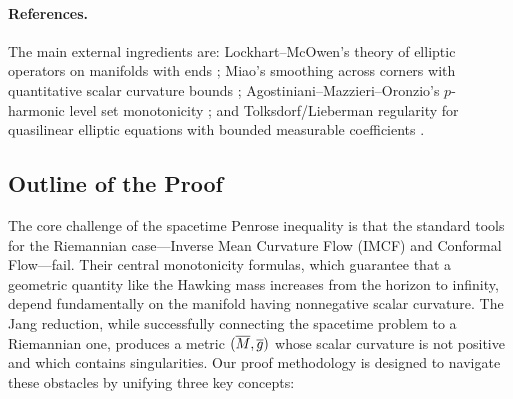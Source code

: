 \paragraph{References.}
The main external ingredients are: Lockhart--McOwen's theory of elliptic operators on manifolds with ends \cite{lockhartmccowen1985}; Miao's smoothing across corners with quantitative scalar curvature bounds \cite{miao2002}; Agostiniani--Mazzieri--Oronzio's $p$-harmonic level set monotonicity \cite{amo2024}; and Tolksdorf/Lieberman regularity for quasilinear elliptic equations with bounded measurable coefficients \cite{tolksdorf1984,lieberman1988}.

\subsection{Outline of the Proof}

The core challenge of the spacetime Penrose inequality is that the standard tools for the Riemannian case---Inverse Mean Curvature Flow (IMCF) and Conformal Flow---fail. Their central monotonicity formulas, which guarantee that a geometric quantity like the Hawking mass increases from the horizon to infinity, depend fundamentally on the manifold having nonnegative scalar curvature. The Jang reduction, while successfully connecting the spacetime problem to a Riemannian one, produces a metric $(\overline{M}, \overline{g})$ whose scalar curvature is not positive and which contains singularities. Our proof methodology is designed to navigate these obstacles by unifying three key concepts:

